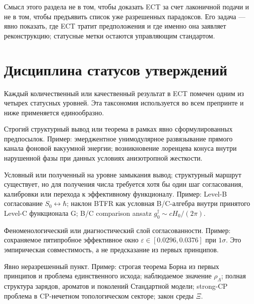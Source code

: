 \documentclass[11pt,a4paper]{article}
\newcommand{\statA}{\textbf{Уровень~A}}
\newcommand{\statB}{\textbf{Уровень~B}}
\newcommand{\statC}{\textbf{Уровень~C}}
\newcommand{\statO}{\textbf{Открыто}}
\begin{document}
Смысл этого раздела не в том, чтобы доказать ECT за счет
лаконичной подачи и не в том, чтобы предъявить список уже
разрешенных парадоксов. Его задача — явно показать, где ECT
тратит предположения и где именно она заявляет реконструкцию;
статусные метки остаются управляющим стандартом.

\section{Дисциплина статусов утверждений}
\label{sec:status_discipline}

Каждый количественный или качественный результат в ECT помечен
одним из четырех статусных уровней. Эта таксономия используется
во всем препринте и ниже применяется единообразно.

\begin{description}[leftmargin=1.4em,itemsep=2pt]
\item[\statA] Строгий структурный вывод или теорема в рамках
      явно сформулированных предпосылок. Пример: эмерджентное
      унимодулярное развязывание прямого канала фоновой
      вакуумной энергии;
      возникновение лоренцева конуса внутри нарушенной фазы при
      данных условиях анизотропной жесткости.
\item[\statB] Условный или полученный на уровне замыкания вывод;
      структурный
      маршрут существует, но для получения числа требуется хотя бы
      один шаг согласования, калибровки или перехода к
      эффективному функционалу.
      Пример: Level-B согласование $S_0\leftrightarrow\hbar$; наклон
      BTFR как условная B/C-алгебра внутри принятого Level-C
      функционала G; B/C comparison ansatz
      $g^\dagger_0\sim cH_0/(2\pi)$.
\item[\statC] Феноменологический или диагностический слой
      согласованности. Пример: сохраняемое пятипробное эффективное
      окно $\varepsilon\in[0.0296,0.0376]$ при $1\sigma$.
      Это эмпирическая совместимость, а не предсказание из первых
      принципов.
\item[\statO] Явно неразрешенный пункт. Пример: строгая теорема
      Борна из первых принципов и проблема единственного исхода;
      наблюдаемое значение $\rho_\Lambda$; полная структура
      зарядов, ароматов и поколений Стандартной модели;
      strong-CP проблема в CP-нечетном топологическом секторе;
      закон среды $\Xi$.
\end{description}
\end{document}
